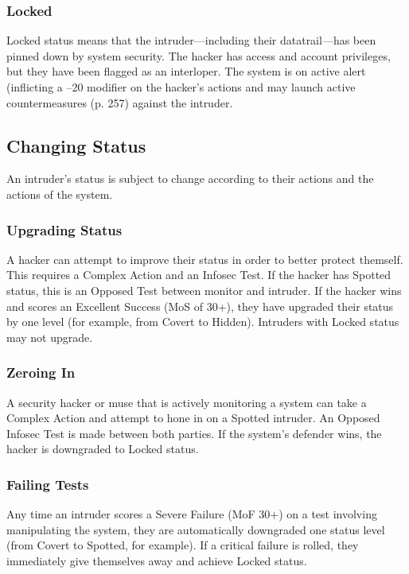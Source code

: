\subsubsection{Locked} 

Locked status means that the intruder—including their datatrail—has been pinned down by system security. The hacker has access and account privileges, but they have been flagged as an interloper. The system is on active alert (inflicting a –20 modifier on the hacker's actions and may launch active countermeasures (p. 257) against the intruder. 

\subsection{Changing Status} 

An intruder's status is subject to change according to their actions and the actions of the system. 

\subsubsection{Upgrading Status} 

A hacker can attempt to improve their status in order to better protect themself. This requires a Complex Action and an Infosec Test. If the hacker has Spotted status, this is an Opposed Test between monitor and intruder. If the hacker wins and scores an Excellent Success (MoS of 30+), they have upgraded their status by one level (for example, from Covert to Hidden). Intruders with Locked status may not upgrade. 

\subsubsection{Zeroing In} 

A security hacker or muse that is actively monitoring a system can take a Complex Action and attempt to hone in on a Spotted intruder. An Opposed Infosec Test is made between both parties. If the system's defender wins, the hacker is downgraded to Locked status. 

\subsubsection{Failing Tests} 

Any time an intruder scores a Severe Failure (MoF 30+) on a test involving manipulating the system, they are automatically downgraded one status level (from Covert to Spotted, for example). If a critical failure is rolled, they immediately give themselves away and achieve Locked status. 

